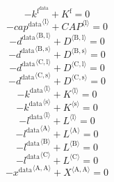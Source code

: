 \begin{equation}
-k^{\mathrm{f}^{\mathrm{data}}} + K^{\mathrm{f}} = 0
\end{equation}
\begin{equation}
-{{c\!a\!p}^{\mathrm{data}}}^{\langle \mathrm{\mathrm{l}}\rangle} + {{C\!A\!P}}^{\langle \mathrm{l}\rangle} = 0
\end{equation}
\begin{equation}
-{d^{\mathrm{data}}}^{\langle \mathrm{\mathrm{B}},\mathrm{\mathrm{l}}\rangle} + {D}^{\langle \mathrm{B},\mathrm{l}\rangle} = 0
\end{equation}
\begin{equation}
-{d^{\mathrm{data}}}^{\langle \mathrm{\mathrm{B}},\mathrm{\mathrm{s}}\rangle} + {D}^{\langle \mathrm{B},\mathrm{s}\rangle} = 0
\end{equation}
\begin{equation}
-{d^{\mathrm{data}}}^{\langle \mathrm{\mathrm{C}},\mathrm{\mathrm{l}}\rangle} + {D}^{\langle \mathrm{C},\mathrm{l}\rangle} = 0
\end{equation}
\begin{equation}
-{d^{\mathrm{data}}}^{\langle \mathrm{\mathrm{C}},\mathrm{\mathrm{s}}\rangle} + {D}^{\langle \mathrm{C},\mathrm{s}\rangle} = 0
\end{equation}
\begin{equation}
-{k^{\mathrm{data}}}^{\langle \mathrm{\mathrm{l}}\rangle} + {K}^{\langle \mathrm{l}\rangle} = 0
\end{equation}
\begin{equation}
-{k^{\mathrm{data}}}^{\langle \mathrm{\mathrm{s}}\rangle} + {K}^{\langle \mathrm{s}\rangle} = 0
\end{equation}
\begin{equation}
-{l^{\mathrm{data}}}^{\langle \mathrm{\mathrm{l}}\rangle} + {L}^{\langle \mathrm{l}\rangle} = 0
\end{equation}
\begin{equation}
-{l^{\mathrm{data}}}^{\langle \mathrm{\mathrm{A}}\rangle} + {L}^{\langle \mathrm{A}\rangle} = 0
\end{equation}
\begin{equation}
-{l^{\mathrm{data}}}^{\langle \mathrm{\mathrm{B}}\rangle} + {L}^{\langle \mathrm{B}\rangle} = 0
\end{equation}
\begin{equation}
-{l^{\mathrm{data}}}^{\langle \mathrm{\mathrm{C}}\rangle} + {L}^{\langle \mathrm{C}\rangle} = 0
\end{equation}
\begin{equation}
-{x^{\mathrm{data}}}^{\langle \mathrm{\mathrm{A}},\mathrm{\mathrm{A}}\rangle} + {X}^{\langle \mathrm{A},\mathrm{A}\rangle} = 0
\end{equation}
